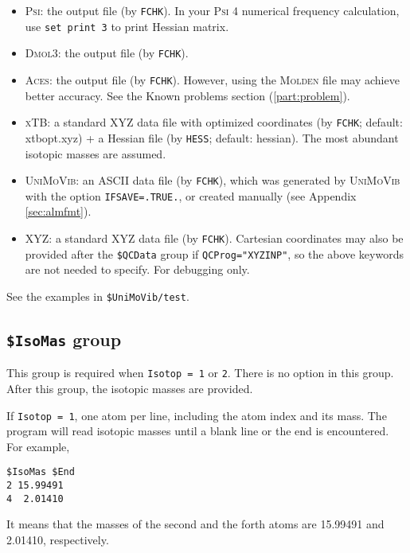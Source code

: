 \documentclass[12pt,english]{extarticle}
\begin{document}
\begin{itemize}
\item \textsc{Psi}: the output file (by \verb|FCHK|). In your \textsc{Psi} 4 numerical frequency calculation, use \texttt{set print 3} to print Hessian matrix.
\item \textsc{Dmol3}: the output file (by \verb|FCHK|).
\item \textsc{Aces}: the output file (by \verb|FCHK|). However, using the \textsc{Molden} file may achieve better accuracy. See the Known problems section (\ref{part:problem}).
\item \textsc{xTB}: a standard XYZ data file with optimized coordinates (by \verb|FCHK|; default: xtbopt.xyz) + a Hessian file (by \verb|HESS|; default: hessian). The most abundant isotopic masses are assumed.
\item \textsc{UniMoVib}: an ASCII data file (by \verb|FCHK|), which was generated by \textsc{UniMoVib} with the option \verb|IFSAVE=.TRUE.|, or created manually (see Appendix \ref{sec:almfmt}).
\item XYZ: a standard XYZ data file (by \verb|FCHK|). Cartesian coordinates may also be provided after the \texttt{\$QCData} group if \verb|QCProg="XYZINP"|, so the above keywords are not needed to specify. For debugging only.
\end{itemize}

See the examples in \verb|$UniMoVib/test|.


\subsection{\texttt{\$IsoMas} group} \label{sec:inp-isomas}

This group is required when \verb|Isotop = 1| or \verb|2|. There is no option in
this group. After this group, the isotopic masses are provided.

\bigskip{}
If \verb|Isotop = 1|, one atom per line, including the atom index and its
mass. The program will read isotopic masses until a blank line or
the end is encountered. For example,
\begin{Verbatim}[frame=single]
 $IsoMas $End
2 15.99491
4  2.01410
\end{Verbatim}
It means that the masses of the second and the forth atoms are 15.99491 and
2.01410, respectively.
\end{document}
